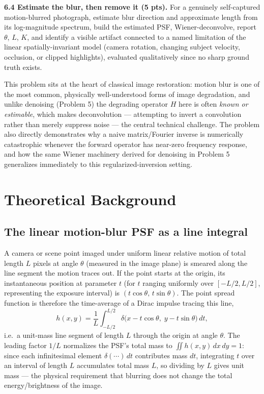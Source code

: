 \documentclass[11pt]{article}
\begin{document}
\textbf{6.4 Estimate the blur, then remove it (5 pts).} For a genuinely self-captured
motion-blurred photograph, estimate blur direction and approximate length from its
log-magnitude spectrum, build the estimated PSF, Wiener-deconvolve, report $\theta$, $L$, $K$,
and identify a visible artifact connected to a named limitation of the linear
spatially-invariant model (camera rotation, changing subject velocity, occlusion, or clipped
highlights), evaluated qualitatively since no sharp ground truth exists.

This problem sits at the heart of classical image restoration: motion blur is one of the most
common, physically well-understood forms of image degradation, and unlike denoising (Problem 5)
the degrading operator $H$ here is often \emph{known or estimable}, which makes deconvolution —
attempting to invert a convolution rather than merely suppress noise — the central technical
challenge. The problem also directly demonstrates why a naive matrix/Fourier inverse is
numerically catastrophic whenever the forward operator has near-zero frequency response, and how
the same Wiener machinery derived for denoising in Problem 5 generalizes immediately to this
regularized-inversion setting.

\section{Theoretical Background}

\subsection{The linear motion-blur PSF as a line integral}

A camera or scene point imaged under uniform linear relative motion of total length $L$ pixels
at angle $\theta$ (measured in the image plane) is smeared along the line segment the motion
traces out. If the point starts at the origin, its instantaneous position at parameter $t$
(for $t$ ranging uniformly over $[-L/2, L/2]$, representing the exposure interval) is
$(t\cos\theta,\, t\sin\theta)$. The point spread function is therefore the time-average of a
Dirac impulse tracing this line,
\[
h(x,y) = \frac1L \int_{-L/2}^{L/2} \delta\big(x - t\cos\theta,\; y - t\sin\theta\big)\, dt,
\]
i.e.\ a unit-mass line segment of length $L$ through the origin at angle $\theta$. The leading
factor $1/L$ normalizes the PSF's total mass to $\iint h(x,y)\,dx\,dy = 1$: since each
infinitesimal element $\delta(\cdots)\,dt$ contributes mass $dt$, integrating $t$ over an
interval of length $L$ accumulates total mass $L$, so dividing by $L$ gives unit mass — the
physical requirement that blurring does not change the total energy/brightness of the image.
\end{document}
